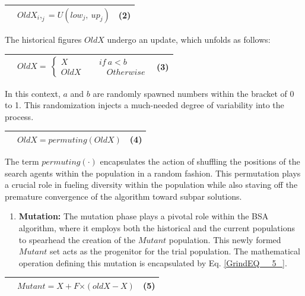 \documentclass{article} %
\begin{document}
\begin{tabular}{|p{0.5in}|p{3.0in}|p{0.4in}|} \hline 
 & $OldX_i,_j=U(low_j,\ up_j)$ & (2) \\ \hline 
\end{tabular}

The historical figures $OldX$ undergo an update, which unfolds as follows:

\begin{tabular}{|p{0.5in}|p{3.0in}|p{0.4in}|} \hline 
 & $OldX=\ \left\{ \begin{array}{c}
X\ \ \ \ \ \ \ \ \ \ \ \ \ \ \ \ \ if\ a<b \\ 
OldX\ \ \ \ \ \ \ \ \ \ \ \ \ \ Otherwise \end{array}
\right.$ & (3) \\ \hline 
\end{tabular}

In this context, $a$ and $b$ are randomly spawned numbers within the bracket of 0 to 1. This randomization injects a much-needed degree of variability into the process.

\begin{tabular}{|p{0.5in}|p{3.0in}|p{0.4in}|} \hline 
 & $OldX=permuting\left(OldX\right)$ & (4) \\ \hline 
\end{tabular}

The term $permuting(\cdot )$ encapsulates the action of shuffling the positions of the search agents within the population in a random fashion. This permutation plays a crucial role in fueling diversity within the population while also staving off the premature convergence of the algorithm toward subpar solutions.

\begin{enumerate}
\item  \textbf{Mutation:} The mutation phase plays a pivotal role within the BSA algorithm, where it employs both the historical and the current populations to spearhead the creation of the $Mutant$ population. This newly formed $Mutant$ set acts as the progenitor for the trial population. The mathematical operation defining this mutation is encapsulated by Eq. \eqref{GrindEQ__5_}.
\end{enumerate}

\begin{tabular}{|p{0.5in}|p{2.9in}|p{0.6in}|} \hline 
 & $Mutant=X+F\mathrm{\times }\left(oldX-X\right)$ & (5) \\ \hline 
\end{tabular}
\end{document}
